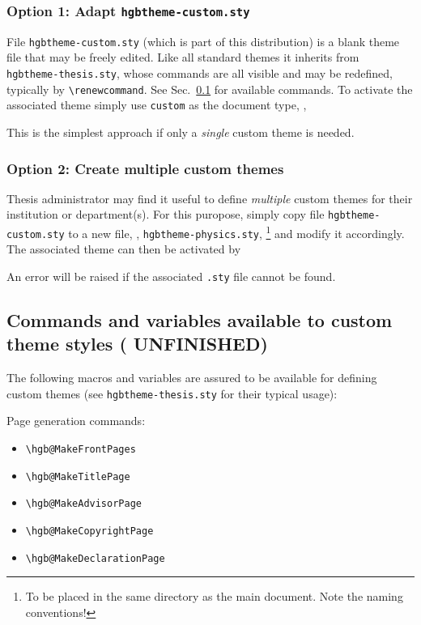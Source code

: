 \documentclass[english]{hgbarticle}
\begin{document}
\subsubsection{Option 1: Adapt \texttt{hgbtheme-custom.sty}}

File \texttt{hgbtheme-custom.sty} (which is part of this distribution) is 
a blank theme file that may be freely edited.
Like all standard themes it inherits from \texttt{hgbtheme-thesis.sty},
whose commands are all visible and may be redefined,
typically by \verb!\renewcommand!. 
See Sec.\ \ref{sec:ThemeStyleCommands} for available commands.
To activate the associated theme simply use \texttt{custom} as the document type,
\ie,
%
%
This is the simplest approach if only a \emph{single} custom theme is needed.

\subsubsection{Option 2: Create multiple custom themes}

Thesis administrator may find it useful to define \emph{multiple} custom themes for their
institution or department(s).
For this puropose, simply copy file \texttt{hgbtheme-custom.sty} to a new file, \eg, 
\texttt{hgbtheme-physics.sty},%
\footnote{To be placed in the same directory as the main document. Note the naming conventions!}
and modify it accordingly. The associated theme can then be activated by
%
%
An error will be raised if the associated \texttt{.sty} file cannot be found.



\subsection{Commands and variables available to custom theme styles ({\color{red} UNFINISHED})}
\label{sec:ThemeStyleCommands}

The following macros and variables are assured to be available for defining custom themes
(see \texttt{hgbtheme-thesis.sty} for their typical usage):

Page generation commands:
\begin{itemize}
  \item \verb!\hgb@MakeFrontPages!
  \item \verb!\hgb@MakeTitlePage!
  \item \verb!\hgb@MakeAdvisorPage!
  \item \verb!\hgb@MakeCopyrightPage!
  \item \verb!\hgb@MakeDeclarationPage!
\end{itemize}
\end{document}
